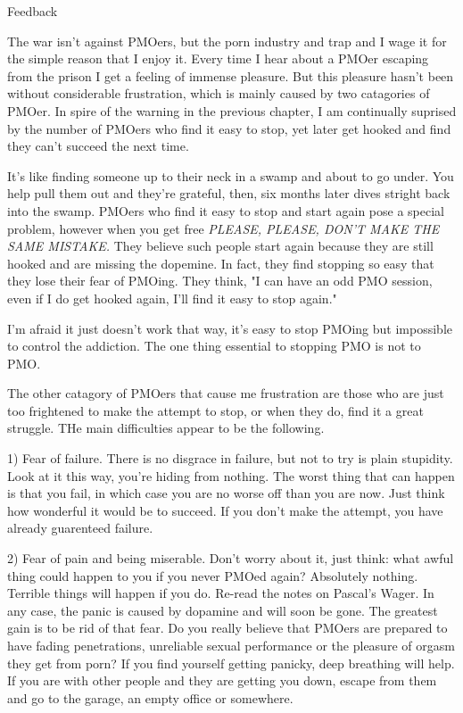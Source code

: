 Feedback

The war isn't against PMOers, but the porn industry and trap and I wage it for the simple reason that I enjoy it. Every time I hear about a PMOer escaping from the prison I get a feeling of immense pleasure. But this pleasure hasn't been without considerable frustration, which is mainly caused by two catagories of PMOer. In spire of the warning in the previous chapter, I am continually suprised by the number of PMOers who find it easy to stop, yet later get hooked and find they can't succeed the next time.

It's like finding someone up to their neck in a swamp and about to go under. You help pull them out and they're grateful, then, six months later dives stright back into the swamp. PMOers who find it easy to stop and start again pose a special problem, however when you get free \textit{PLEASE, PLEASE, DON'T MAKE THE SAME MISTAKE.} They believe such people start again because they are still hooked and are missing the dopemine. In fact, they find stopping so easy that they lose their fear of PMOing. They think, "I can have an odd PMO session, even if I do get hooked again, I'll find it easy to stop again."

I'm afraid it just doesn't work that way, it's easy to stop PMOing but impossible to control the addiction. The one thing essential to stopping PMO is not to PMO. 

The other catagory of PMOers that cause me frustration are those who are just too frightened to make the attempt to stop, or when they do, find it a great struggle. THe main difficulties appear to be the following.

  1) Fear of failure. There is no disgrace in failure, but not to try is plain stupidity. Look at it this way, you're hiding from nothing. The worst thing that can happen is that you fail, in which case you are no worse off than you are now. Just think how wonderful it would be to succeed. If you don't make the attempt, you have already guarenteed failure.

  2) Fear of pain and being miserable. Don't worry about it, just think: what awful thing could happen to you if you never PMOed again? Absolutely nothing. Terrible things will happen if you do. Re-read the notes on Pascal's Wager. In any case, the panic is caused by dopamine and will soon be gone. The greatest gain is to be rid of that fear. Do you really believe that PMOers are prepared to have fading penetrations, unreliable sexual performance or the pleasure of orgasm they get from porn? If you find yourself getting panicky, deep breathing will help. If you are with other people and they are getting you down, escape from them and go to the garage, an empty office or somewhere.

